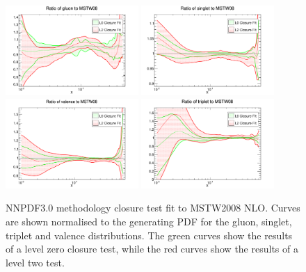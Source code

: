\begin{figure}[!]
\centering
\includegraphics[width=0.45\textwidth]{7-PostLHC/figs/finalClosure/MSTW0/gluon.pdf}
\includegraphics[width=0.45\textwidth]{7-PostLHC/figs/finalClosure/MSTW0/singlet.pdf}
\includegraphics[width=0.45\textwidth]{7-PostLHC/figs/finalClosure/MSTW0/valence.pdf}
\includegraphics[width=0.45\textwidth]{7-PostLHC/figs/finalClosure/MSTW0/triplet.pdf}
\caption[NNPDF3.0 methodology closure test fit to MSTW2008 NLO]{NNPDF3.0 methodology closure test fit to MSTW2008 NLO. Curves are shown normalised to the generating PDF for the gluon, singlet, triplet and valence distributions. The green curves show the results of a level zero closure test, while the red curves show the results of a level two test.}
\label{fig:finalClosure_MSTW}
\end{figure}
